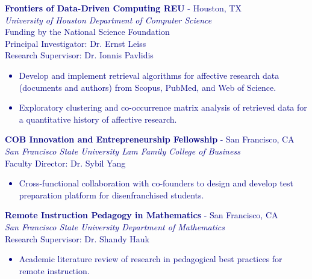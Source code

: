 \documentclass[hidelinks, 10pt]{article}
\newcommand{\bodyspacing}{1mm}
\begin{document}
\begin{textblock}{9}
\textcolor{navy}{{\textbf{Frontiers of Data-Driven Computing REU} - Houston, TX}\\
\emph{University of Houston Department of Computer Science}\\
Funding by the National Science Foundation\\
Principal Investigator: Dr. Ernst Leiss\\
Research Supervisor: Dr. Ionnis Pavlidis
    \begin{itemize}[leftmargin=5mm]
    	\setlength\itemsep{-0.25em}
    	\item Develop and implement retrieval algorithms for affective research
    	data (documents and authors) from Scopus, PubMed, and Web of Science.
		\item Exploratory clustering and co-occurrence matrix analysis of
		retrieved data for a quantitative history of affective research.
    \end{itemize}}

\vspace{\bodyspacing}

\textcolor{navy}{{\textbf{COB Innovation and Entrepreneurship Fellowship} - San Francisco, CA}\\
\emph{San Francisco State University Lam Family College of Business}\\
Faculty Director: Dr. Sybil Yang
    \begin{itemize}[leftmargin=5mm]
    	\setlength\itemsep{-0.25em}
    	\item Cross-functional collaboration with co-founders to design and develop test preparation platform for disenfranchised students.
    \end{itemize}}

\vspace{4mm}


\textcolor{navy}{{\textbf{Remote Instruction Pedagogy in Mathematics} - San Francisco, CA}\\
\emph{San Francisco State University Department of Mathematics}\\
Research Supervisor: Dr. Shandy Hauk
    \begin{itemize}[leftmargin=5mm]
    	\setlength\itemsep{-0.25em}
    	\item Academic literature review of research in pedagogical best practices for remote instruction.
	\end{itemize}}


\end{textblock}
\end{document}
